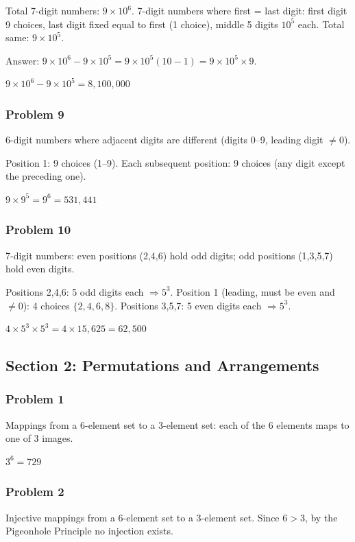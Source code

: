 Total 7-digit numbers: $9\times 10^6$.
7-digit numbers where first = last digit: first digit 9 choices, last digit fixed equal to first (1 choice), middle 5 digits $10^5$ each. Total same: $9\times 10^5$.

Answer: $9\times 10^6 - 9\times 10^5 = 9\times 10^5(10-1)=9\times 10^5\times 9$.

$\boxed{9\times 10^6 - 9\times 10^5 = 8{,}100{,}000}$

\subsubsection*{Problem 9}
6-digit numbers where adjacent digits are different (digits 0--9, leading digit $\neq 0$).

Position 1: 9 choices (1--9). Each subsequent position: 9 choices (any digit except the preceding one).

$\boxed{9 \times 9^5 = 9^6 = 531{,}441}$

\subsubsection*{Problem 10}
7-digit numbers: even positions (2,4,6) hold odd digits; odd positions (1,3,5,7) hold even digits.

Positions 2,4,6: 5 odd digits each $\Rightarrow 5^3$.
Position 1 (leading, must be even and $\neq 0$): 4 choices $\{2,4,6,8\}$.
Positions 3,5,7: 5 even digits each $\Rightarrow 5^3$.

$\boxed{4 \times 5^3 \times 5^3 = 4 \times 15{,}625 = 62{,}500}$

\subsection*{Section 2: Permutations and Arrangements}

\subsubsection*{Problem 1}
Mappings from a 6-element set to a 3-element set: each of the 6 elements maps to one of 3 images.

$\boxed{3^6 = 729}$

\subsubsection*{Problem 2}
Injective mappings from a 6-element set to a 3-element set.
Since $6 > 3$, by the Pigeonhole Principle no injection exists.

